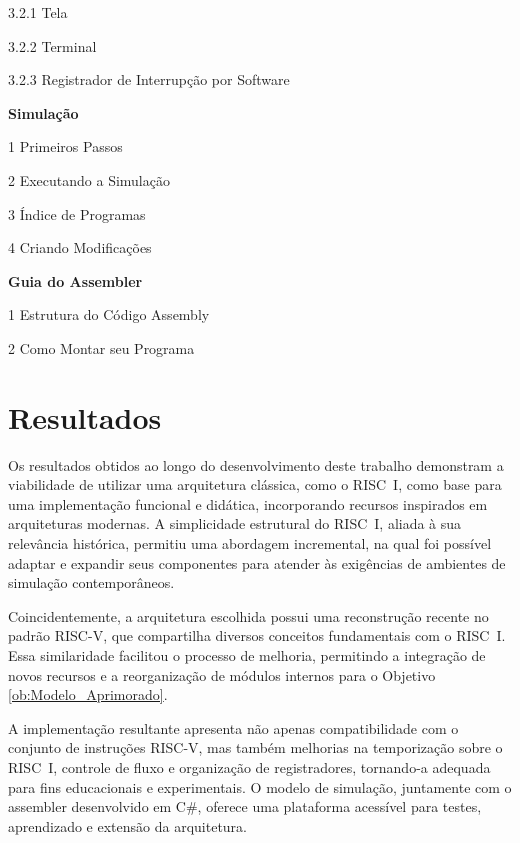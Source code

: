 \documentclass[
	12pt,				%
	openright,			%
	oneside,			%
	a4paper,			%
	english,			%
	french,				%
	spanish,			%
	brazil,				%
	]{abntex2}
\newenvironment{boxedsmall}{%
  \begin{framed}\small
  \begin{minipage}{\dimexpr\linewidth-2\fboxsep-2\fboxrule}
}{%
  \end{minipage}
  \end{framed}
}
\begin{document}
\begin{boxedsmall}
\hspace*{3em}3.2.1 Tela

\hspace*{3em}3.2.2 Terminal

\hspace*{2em}3.2.3 Registrador de Interrupção por Software

\textbf{Simulação}

\hspace*{1em}1 Primeiros Passos

\hspace*{1em}2 Executando a Simulação

\hspace*{1em}3 Índice de Programas

\hspace*{1em}4 Criando Modificações

\textbf{Guia do Assembler}

\hspace*{1em}1 Estrutura do Código Assembly

\hspace*{1em}2 Como Montar seu Programa
\end{boxedsmall}

\chapter{Resultados}\label{resultados}

Os resultados obtidos ao longo do desenvolvimento deste trabalho demonstram a viabilidade de utilizar uma arquitetura clássica, como o RISC~I, como base para uma implementação funcional e didática, incorporando recursos inspirados em arquiteturas modernas. A simplicidade estrutural do RISC~I, aliada à sua relevância histórica, permitiu uma abordagem incremental, na qual foi possível adaptar e expandir seus componentes para atender às exigências de ambientes de simulação contemporâneos.

Coincidentemente, a arquitetura escolhida possui uma reconstrução recente no padrão RISC-V, que compartilha diversos conceitos fundamentais com o RISC~I. Essa similaridade facilitou o processo de melhoria, permitindo a integração de novos recursos e a reorganização de módulos internos para o Objetivo \ref{ob:Modelo_Aprimorado}.

A implementação resultante apresenta não apenas compatibilidade com o conjunto de instruções RISC-V, mas também melhorias na temporização sobre o RISC~I, controle de fluxo e organização de registradores, tornando-a adequada para fins educacionais e experimentais. O modelo de simulação, juntamente com o assembler desenvolvido em C\#, oferece uma plataforma acessível para testes, aprendizado e extensão da arquitetura.
\end{document}
